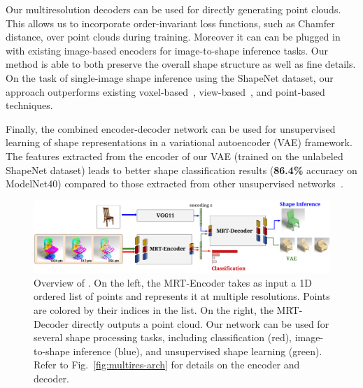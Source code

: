 Our multiresolution decoders can be used for directly generating point clouds.
This allows us to incorporate order-invariant loss functions, such as Chamfer distance, over point clouds during training. 
Moreover it can can be plugged in with existing image-based encoders for image-to-shape inference tasks.
Our method is able to both preserve the overall shape structure as well as fine details. 
On the task of single-image shape inference using the ShapeNet dataset, our approach outperforms existing voxel-based~\cite{choy20163d}, view-based~\cite{lin2018learning}, and point-based~\cite{fan2016point} techniques.

Finally, the combined encoder-decoder network can be used for unsupervised learning of shape representations in a variational autoencoder (VAE) framework. The features extracted from the encoder of our VAE (trained on the unlabeled ShapeNet dataset) leads to better shape classification results (\textbf{86.4\%} accuracy on ModelNet40) compared to those extracted from other unsupervised networks~\cite{3dgan}.

\begin{figure}[t!]
\centering
\includegraphics[width=1.0\linewidth]{MRTNet/imgs/visabstract1.pdf}
\vspace{-20pt}
	\caption{\small \label{fig:multires-abs}
  Overview of \mrtnet. On the left, the MRT-Encoder takes as input a 1D ordered list of points and represents it at multiple resolutions. Points are colored by their indices in the list. On the right, the MRT-Decoder directly outputs a point cloud. Our network can be used for several shape processing tasks, including classification (red), image-to-shape inference (blue), and unsupervised shape learning (green). Refer to Fig.~\ref{fig:multires-arch} for details on the encoder and decoder.}
\vspace{-16pt}
\end{figure}





